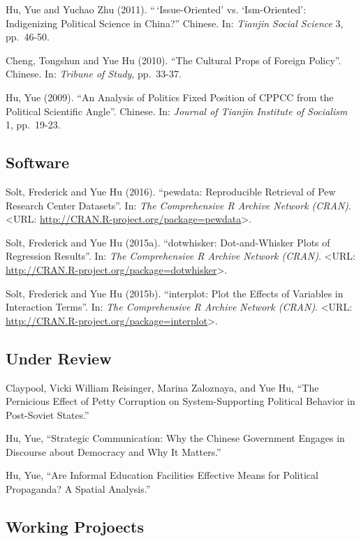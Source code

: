 \documentclass[10.5pt,]{article}
\begin{document}
Hu, Yue and Yuchao Zhu (2011). ``\,`Issue-Oriented' vs. `Ism-Oriented':
Indigenizing Political Science in China?'' Chinese. In: \emph{Tianjin
Social Science} 3, pp.~46-50.

Cheng, Tongshun and Yue Hu (2010). ``The Cultural Props of Foreign
Policy''. Chinese. In: \emph{Tribune of Study}, pp.~33-37.

Hu, Yue (2009). ``An Analysis of Politics Fixed Position of CPPCC from
the Political Scientific Angle''. Chinese. In: \emph{Journal of Tianjin
Institute of Socialism} 1, pp.~19-23.

\subsection{Software}\label{software}

Solt, Frederick and Yue Hu (2016). ``pewdata: Reproducible Retrieval of
Pew Research Center Datasets''. In: \emph{The Comprehensive R Archive
Network (CRAN)}. \textless{}URL:
\url{http://CRAN.R-project.org/package=pewdata}\textgreater{}.

Solt, Frederick and Yue Hu (2015a). ``dotwhisker: Dot-and-Whisker Plots
of Regression Results''. In: \emph{The Comprehensive R Archive Network
(CRAN)}. \textless{}URL:
\url{http://CRAN.R-project.org/package=dotwhisker}\textgreater{}.

Solt, Frederick and Yue Hu (2015b). ``interplot: Plot the Effects of
Variables in Interaction Terms''. In: \emph{The Comprehensive R Archive
Network (CRAN)}. \textless{}URL:
\url{http://CRAN.R-project.org/package=interplot}\textgreater{}.

\subsection{Under Review}\label{under-review}

Claypool, Vicki William Reisinger, Marina Zaloznaya, and Yue Hu, ``The
Pernicious Effect of Petty Corruption on System-Supporting Political
Behavior in Post-Soviet States.''

Hu, Yue, ``Strategic Communication: Why the Chinese Government Engages
in Discourse about Democracy and Why It Matters.''

Hu, Yue, ``Are Informal Education Facilities Effective Means for
Political Propaganda? A Spatial Analysis.''

\subsection{Working Projoects}\label{working-projoects}
\end{document}
